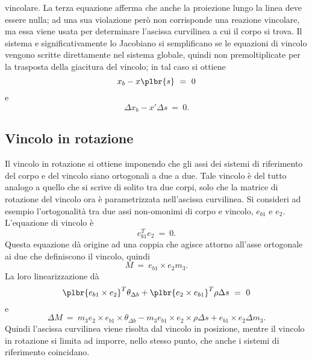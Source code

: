 \documentclass[12pt,dvips,fleqn,italian]{article}
\begin{document}
vincolare.
La terza equazione afferma che anche la proiezione lungo la linea deve
essere nulla; ad una sua violazione per\`{o} non corrisponde una reazione
vincolare, ma essa viene usata per determinare l'ascissa curvilinea a cui il
corpo si trova.
Il sistema e significativamente lo Jacobiano si semplificano se le equazioni
di vincolo vengono scritte direttamente nel sistema globale, quindi non
premoltiplicate per la trasposta della giacitura del vincolo; in tal caso si
ottiene
\begin{displaymath}
    x_b - x\plbr{s} \ = \ 0
\end{displaymath}
e 
\begin{displaymath}
    \Delta{x_b} - x' \Delta{s} \ = \ 0 .
\end{displaymath}



\subsection*{Vincolo in rotazione}
Il vincolo in rotazione si ottiene imponendo che gli assi dei sistemi di
riferimento del corpo e del vincolo siano ortogonali a due a due.
Tale vincolo \`{e} del tutto analogo a quello che si scrive di solito tra
due corpi, solo che la matrice di rotazione del vincolo ora \`{e}
parametrizzata nell'ascissa curvilinea.
Si consideri ad esempio l'ortogonalit\`{a} tra due assi non-omonimi di corpo
e vincolo, $ e_{b1} $ e $ e_2 $.
L'equazione di vincolo \`{e}
\begin{displaymath}
    e_{b1}^T e_2 \ = \ 0 .
\end{displaymath}
Questa equazione d\`{a} origine ad una coppia che agisce attorno all'asse
ortogonale ai due che definiscono il vincolo, quindi
\begin{displaymath}
    M \ = \ e_{b1} \times e_2 m_3 .
\end{displaymath}
La loro linearizzazione d\`{a}
\begin{displaymath}
    \plbr{ e_{b1} \times e_2 }^T \theta_{\Delta{b}}
    +\plbr{ e_2 \times e_{b1} }^T \rho \Delta{s} \ = \ 0
\end{displaymath}
e
\begin{displaymath}
    \Delta{M} \ = \
        m_3 e_2 \times e_{b1} \times \theta_{\Delta{b}}
	- m_3 e_{b1} \times e_2 \times \rho \Delta{s}
	+ e_{b1} \times e_2 \Delta{m_3} .
\end{displaymath}
Quindi l'ascissa curvilinea viene risolta dal vincolo in posizione, mentre
il vincolo in rotazione si limita ad imporre, nello stesso punto, che anche
i sistemi di riferimento coincidano.
\end{document}
